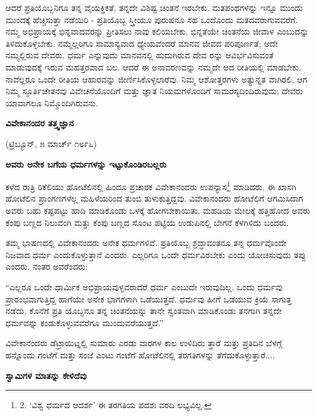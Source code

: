 ಆದರೆ ಪ್ರತಿಯೊಬ್ಬನಿಗೂ ತನ್ನ ವೈಯಕ್ತಿಕತೆ, ತನ್ನದೇ ವಿಶಿಷ್ಟ ಚಿಂತನೆ ಇರಬೇಕು. ಮತಪಂಥಗಳನ್ನು ಇನ್ನೂ ಮುಂದು ಮುಂದಕ್ಕೆ ಹೆಚ್ಚಿಸುತ್ತಾ ನಡೆಯಿರಿ - ಪ್ರತಿಯೊಬ್ಬ ಸ್ತ್ರೀಯೂ ಪುರುಷನೂ ಸಹ ಒಂದೊಂದು ಮತದವರಾಗುವವರೆಗೆ. ನಮ್ಮ ಅಭಿಪ್ರಾಯಕ್ಕೆ ಭಿನ್ನವಾದವರನ್ನು ಪ್ರೀತಿಸಲು ನಾವು ಕಲಿಯಬೇಕು. ಭಿನ್ನತೆಯೇ ಚಿಂತನೆಯ ಜೀವಾಳ ಎಂಬುದನ್ನು ತಿಳಿದುಕೊಳ್ಳಬೇಕು. ನಮ್ಮೆಲ್ಲರಿಗೂ ಸಾಮಾನ್ಯವಾದ ಧ್ಯೇಯವೆಂದರೆ ಮಾನವ ಜೀವದ ಪರಿಪೂರ್ಣತೆ; ಅದೇ ನಮ್ಮಲ್ಲಿರುವ ದೇವರು. ಧರ್ಮ ಎನ್ನುವುದು ಮಾನವನಲ್ಲಿ ಹುದುಗಿರುವ ದೇವ ರನ್ನು ಆವಿರ್ಭವಿಸುವಂತೆ ಮಾಡುವುದಕ್ಕೆ ಇರುವ ಮಹತ್ತರವಾದ ಬಲ. ಆದರೆ ಈ ಅನಾವರಣವನ್ನು ನಮ್ಮದೇ ಆದ ರೀತಿಯಲ್ಲಿ ಮಾಡಬೇಕು. ನಾವೆಲ್ಲರೂ ಒಂದೇ ರೀತಿಯ ಆಹಾರವನ್ನು ಜೀರ್ಣಿಸಿಕೊಳ್ಳಲಾರೆವು. ನಿಮ್ಮ ಆಶೋತ್ತರಗಳು ಅತ್ಯುನ್ನತ ವಾಗಿರಲಿ, ಆಗ ನಿಮ್ಮ ಸ್ಫೂರ್ತಿಚೇತನವು ವಿವೇಚನೆಯೊಂದಿಗೆ ಮತ್ತು ಜ್ಞಾತ ನಿಯಮಗಳೊಂದಿಗೆ ಸಾಮರಸ್ಯದಿಂದಿರುವುದು; ದೇವರು ಯಾವಾಗಲೂ ನಿಮ್ಮೊಂದಿಗಿರುವನು.

\begin{center}
\textbf{ವಿವೇಕಾನಂದರ ತತ್ತ್ವಜ್ಞಾನ}
\end{center}

\begin{center}
(ಟ್ರಿಬ್ಯೂನ್, ೫ ಮಾರ್ಚ್ ೧೮೯೬)
\end{center}

\begin{center}
\textbf{ಅವರು ಅನೇಕ ಬಗೆಯ ಧರ್ಮಗಳನ್ನು ಇಟ್ಟುಕೊಂಡಿರಬಲ್ಲರು}
\end{center}

ಕಳೆದ ರಾತ್ರಿ ರಿಕೆಲಿಯು ಹೋಟೆಲಿನಲ್ಲಿ ಹಿಂದೂ ಪ್ರಚಾರಕ ವಿವೇಕಾನಂದರು ಉಪನ್ಯಾಸ\footnote{2. ‘ವಿಶ್ವ ಧರ್ಮದ ಆದರ್ಶ’ ಈ ತರಗತಿಯ ಪದಶಃ ವರದಿ ಲಭ್ಯವಿಲ್ಲ.} ಮಾಡಿದರು. ಈ ಖಾಸಗಿ ಹೋಟೆಲಿನ ಪ್ರಾಂಗಣಗಳೆಲ್ಲ ಮಹಿಳೆಯರಿಂದ ತುಂಬಿ ತುಳುಕುತ್ತಿದ್ದವು. ವಿವೇಕಾನಂದರು ಹೋಟೆಲಿಗೆ ಆಗಮಿಸಿದಾಗ ಅವರು ಬಹು ಕಷ್ಟಪಟ್ಟು ಹಾದಿ ಮಾಡಿಕೊಂಡು ಒಳಕ್ಕೆ ಹೋಗಬೇಕಾಯಿತು. ಮಹಡಿಯ ಮೇಲಕ್ಕೆ ಹತ್ತಿಹೋದ ಅವರು ಕೆಂಪು ಬಣ್ಣದ ನಿಲುವಂಗಿ ಮತ್ತು ಕೆಂಪು ಬಣ್ಣದ ಸೊಂಟ ಪಟ್ಟಿಯ ಉಡುಪಿನಲ್ಲಿ ಬೇಗನೆ ಕೆಳಗಿಳಿದು ಬಂದರು.

ತಮ್ಮ ಭಾಷಣದಲ್ಲಿ ವಿವೇಕಾನಂದರು ಅನೇಕ ಧರ್ಮಗಳಿವೆ. ಪ್ರತಿಯೊಬ್ಬ ಶ್ರದ್ಧಾವಂತನೂ ತನ್ನ ಧರ್ಮವೊಂದೇ ನಿಜವಾದ ಧರ್ಮ ಎಂದುಕೊಳ್ಳುತ್ತಾನೆ ಎಂದರು. ಎಲ್ಲರಿಗೂ ಒಂದೇ ಧರ್ಮವಿರಬೇಕು ಎಂದು ಯೋಚಿಸುವುದು ತಪ್ಪು ಎಂದರು. ನಂತರ ಅವರೆಂದರು:

“ಎಲ್ಲರೂ ಒಂದೇ ಧಾರ್ಮಿಕ ಅಭಿಪ್ರಾಯವುಳ್ಳವರಾದರೆ ಧರ್ಮ ಎಂಬುದೇ ಇರುವುದಿಲ್ಲ. ಒಂದು ಧರ್ಮವು ಪ್ರಾರಂಭವಾಗುತ್ತಿದ್ದ ಹಾಗೆಯೇ ಅನೇಕ ಭಾಗಗಳಾಗಿ ಒಡೆಯುತ್ತದೆ. ಧರ್ಮವು ಹೀಗೆ ಒಡೆಯುವ ಕ್ರಿಯೆ ಸಾಗುತ್ತ ನಡೆದು, ಕೊನೆಗೆ ಪ್ರತಿ ಯೊಬ್ಬನೂ ತನ್ನ ಚಿಂತನೆಯನ್ನು ತಾನೇ ಸ್ವಂತವಾಗಿ ಮಾಡಿಕೊಂಡು ತನಗಾಗಿ ತನ್ನದೇ ಧರ್ಮವನ್ನು ಕಂಡುಕೊಳ್ಳುವವರೆಗೂ ಮುಂದುವರೆಯುತ್ತದೆ.”

ವಿವೇಕಾನಂದರು ಡೆಟ್ರಾಯಿಟ್ನಲ್ಲಿ ಸುಮಾರು ಎರಡು ವಾರಗಳ ಕಾಲ ಉಳಿದಿರು ತ್ತಾರೆ ಮತ್ತು ಪ್ರತಿದಿನ ಬೆಳಗ್ಗೆ ಹನ್ನೊಂದು ಗಂಟೆಗೆ ಮತ್ತು ಸಂಜೆ ಎಂಟು ಗಂಟೆಗೆ ಹೋಟೆಲಿನಲ್ಲಿ ತರಗತಿಗಳನ್ನು ತೆಗೆದುಕೊಳ್ಳುತ್ತಾರೆ....

\begin{center}
\textbf{ಸ್ವಾಮಿಗಳ ಮಾತನ್ನು ಕೇಳಿದೆವು}
\end{center}

